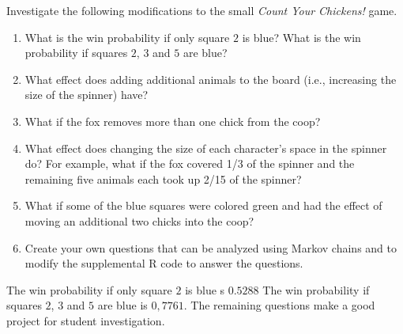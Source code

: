 \documentclass[12pt]{article}
\begin{document}
\begin{exercise}
    Investigate the following modifications to the small \emph{Count
    Your Chickens!} game.
    \begin{enumerate}[label=(\alph*)]
    \item
        What is the win probability if only square \( 2 \) is blue?
        What is the win probability if squares \( 2 \), \( 3 \) and \( 5
        \) are blue?
    \item
        What effect does adding additional animals to the board (i.e.,
        increasing the size of the spinner) have?
    \item
        What if the fox removes more than one chick from the coop?
    \item
        What effect does changing the size of each character’s space
        in the spinner do?  For example, what if the fox covered 1/3 of
        the spinner and the remaining five animals each took up 2/15 of
        the spinner?
    \item
        What if some of the blue squares were colored green and had the
        effect of moving an additional two chicks into the coop?
    \item
        Create your own questions that can be analyzed using Markov
        chains and to modify the supplemental R code to answer the
        questions.
\end{enumerate}
\end{exercise}
\begin{solution}
    The win probability if only square \( 2 \) is blue s \( 0.5288 \)
    The win probability if squares \( 2 \), \( 3 \) and \( 5 \) are blue
    is \( 0,7761 \). The remaining questions make a good project for
    student investigation.
\end{solution}
\end{document}
